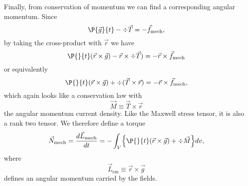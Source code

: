 Finally, from conservation of momentum we can find a corresponding angular momentum. Since
\begin{equation}
    \P{\vec g}{t} - \div \vec T = -\vec f_\text{mech},
\end{equation}
by taking the cross-product with $\vec r$ we have
\begin{equation}
    \P{}{t}(\vec r \times \vec g) - \vec r \times \div \vec T) = -\vec r \times \vec f_\text{mech}
\end{equation}
or equivalently
\begin{equation}
    \P{}{t}(\vec r \times \vec g) + \div (\vec T\times \vec r) = -\vec r \times \vec f_\text{mech},
\end{equation}
which again looks like a conservation law with
\begin{equation}
    \vec M \equiv \vec T \times \vec r
\end{equation}
the angular momentum current density. Like the Maxwell stress tensor, it is also a rank two tensor. We therefore define a torque
\begin{equation}
    \vec N_\text{mech} = \frac{d\vec L_\text{mech}}{dt} = -\int_V \set*{\P{}{t}(\vec r \times \vec g) + \div \vec M} dv,
\end{equation}
where
\begin{equation}
    \vec L_\text{em} \equiv \vec r \times \vec g
\end{equation}
defines an angular momentum carried by the fields.